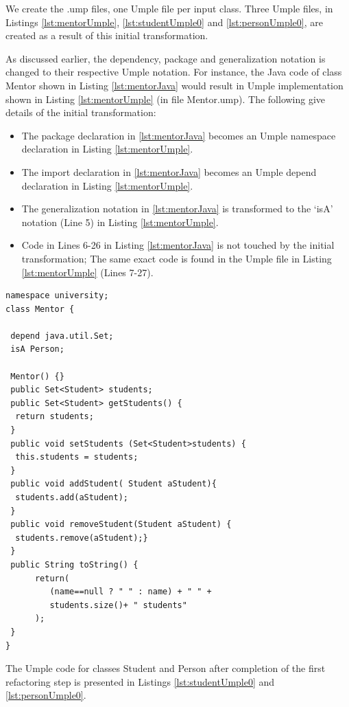 We create the .ump files, one Umple file per input class. Three Umple files, in Listings \ref{lst:mentorUmple}, \ref{lst:studentUmple0} and  \ref{lst:personUmple0}, are created as a result of this initial transformation. 

As discussed earlier, the dependency, package and generalization notation is changed to their respective Umple notation. For instance, the Java code of class Mentor shown in Listing \ref{lst:mentorJava} would result in  Umple implementation shown in Listing  \ref{lst:mentorUmple} (in file Mentor.ump). The following give details of the initial transformation:

\begin{itemize}
\item The package declaration in \ref{lst:mentorJava} becomes an Umple namespace declaration in Listing \ref{lst:mentorUmple}.
\item The import declaration in \ref{lst:mentorJava} becomes an Umple depend declaration in Listing \ref{lst:mentorUmple}.
\item The generalization notation in \ref{lst:mentorJava} is transformed to the `isA' notation (Line 5) in Listing \ref{lst:mentorUmple}.
\item Code in Lines 6-26 in Listing \ref{lst:mentorJava} is not touched by the initial transformation; The same exact code is found in the Umple file in Listing \ref{lst:mentorUmple} (Lines 7-27).
\end{itemize}

\begin{lstlisting}[style=UmpleIn,caption=Mentor.ump,label=lst:mentorUmple]
namespace university;
class Mentor { 

 depend java.util.Set;
 isA Person;
 
 Mentor() {}
 public Set<Student> students;
 public Set<Student> getStudents() {
  return students; 
 } 
 public void setStudents (Set<Student>students) { 
  this.students = students;
 } 
 public void addStudent( Student aStudent){
  students.add(aStudent); 
 }
 public void removeStudent(Student aStudent) {
  students.remove(aStudent);} 
 } 
 public String toString() {
      return(
         (name==null ? " " : name) + " " +
         students.size()+ " students"
      );
 }
}
\end{lstlisting}

The Umple code for classes Student and Person after completion of the first refactoring step is presented in Listings \ref{lst:studentUmple0} and \ref{lst:personUmple0}. 

